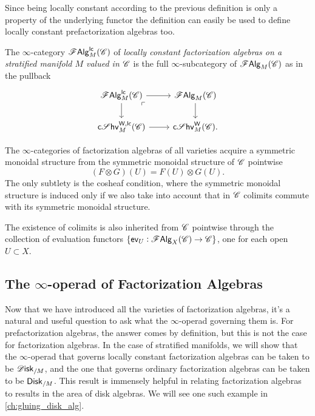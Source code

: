 \documentclass[../text]{subfiles}
\begin{document}
\begin{remark}
    Since being locally constant according to the previous definition is only a property of the underlying functor the definition can easily be used to define locally constant prefactorization algebras too.
\end{remark}

\begin{definition}
    The $\infty$-category $\mathscr{F} \mathsf{Alg}^{\mathsf{lc}}_M (\mathscr{C})$ of \emph{locally constant factorization algebras on a stratified manifold $M$ valued in $\mathscr{C}$} is the full $\infty$-subcategory of $\mathscr{F} \mathsf{Alg}_M (\mathscr{C})$ as in the pullback
    \begin{equation}
        \begin{tikzcd}
            \lcfa_M (\catC) \arrow[dr, phantom, "\ulcorner", very near start] \arrow[r] \arrow[d] & \falg_M (\catC) \arrow[d] \\
            \csheaves[W, lc]_M (\catC) \arrow[r] & \csheaves[W]_M (\catC).
        \end{tikzcd}
    \end{equation}
\end{definition}

\begin{remark}\label{rem:sym_mon_inheritance}
    The $\infty$-categories of factorization algebras of all varieties acquire a symmetric monoidal structure from the symmetric monoidal structure of $\mathscr{C}$ pointwise
    \begin{equation}
        (F \otimes G)(U) = F(U) \otimes G(U).
    \end{equation}
    The only subtlety is the cosheaf condition, where the symmetric monoidal structure is induced only if we also take into account that in $\mathscr{C}$ colimits commute with its symmetric monoidal structure.

    The existence of colimits is also inherited from $\mathscr{C}$ pointwise through the collection of evaluation functors $\{ \mathsf{ev}_U: \mathscr{F} \mathsf{Alg}_X (\mathscr{C}) \rightarrow \mathscr{C} \}$, one for each open $U \subset X$.
\end{remark}



\subsection{The \texorpdfstring{$\infty$-}{infinity }operad of Factorization Algebras}

Now that we have introduced all the varieties of factorization algebras, it's a natural and useful question to ask what the $\infty$-operad governing them is. For prefactorization algebras, the answer comes by definition, but this is not the case for factorization algebras. In the case of stratified manifolds, we will show that the $\infty$-operad that governs locally constant factorization algebras can be taken to be $\disk_{/M}$, and the one that governs ordinary factorization algebras can be taken to be $\disk[r]_{/M}$. This result is immensely helpful in relating factorization algebras to results in the area of disk algebras. We will see one such example in \cref{ch:gluing_disk_alg}.
\end{document}
